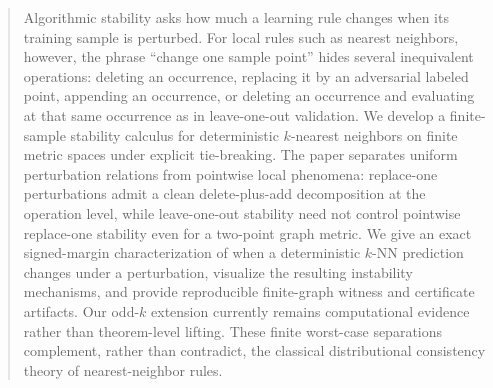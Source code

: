 \begin{abstract}
Algorithmic stability asks how much a learning rule changes when its training
sample is perturbed. For local rules such as nearest neighbors, however, the
phrase ``change one sample point'' hides several inequivalent operations:
deleting an occurrence, replacing it by an adversarial labeled point,
appending an occurrence, or deleting an occurrence and evaluating at that same
occurrence as in leave-one-out validation. We develop a finite-sample
stability calculus for deterministic $k$-nearest neighbors on finite metric
spaces under explicit tie-breaking. The paper separates uniform perturbation
relations from pointwise local phenomena: replace-one perturbations admit a
clean delete-plus-add decomposition at the operation level, while leave-one-out
stability need not control pointwise replace-one stability even for a two-point
graph metric. We give an exact signed-margin characterization of when a
deterministic $k$-NN prediction changes under a perturbation, visualize the
resulting instability mechanisms, and provide reproducible finite-graph witness
and certificate artifacts. Our odd-$k$ extension currently remains
computational evidence rather than theorem-level lifting. These finite
worst-case separations complement, rather than contradict, the classical
distributional consistency theory of nearest-neighbor rules.
\end{abstract}
